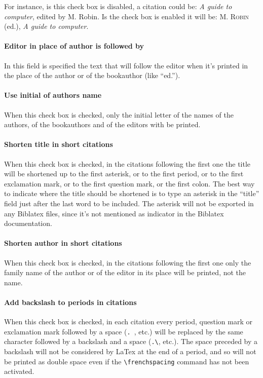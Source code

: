 \documentclass[a4paper,12pt]{report}
\begin{document}
\noindent For instance, is this check box is disabled, a citation could be: \textit{A guide to computer}, edited by M. Robin. Is the check box is enabled it will be: \textsc{M. Robin} (ed.), \textit{A guide to computer}.

\paragraph{Editor in place of author is followed by} In this field is specified the text that will follow the editor when it's printed in the place of the author or of the bookauthor (like “ed.”).

\paragraph{Use initial of authors name} When this check box is checked, only the initial letter of the names of the authors, of the bookauthors and of the editors with be printed.

\paragraph{Shorten title in short citations} When this check box is checked, in the citations following the first one the title will be shortened up to the first asterisk, or to the first period, or to the first exclamation mark, or to the first question mark, or the first colon. The best way to indicate where the title should be shortened is to type an asterisk in the “title” field just after the last word to be included. The asterisk will not be exported in any Biblatex files, since it's not mentioned as indicator in the Biblatex documentation.

\paragraph{Shorten author in short citations} When this check box is checked, in the citations following the first one only the family name of the author or of the editor in its place will be printed, not the name.

\paragraph{Add backslash to periods in citations} When this check box is checked, in each citation every period, question mark or exclamation mark followed by a space (\texttt{. }, etc.) will be replaced by the same character followed by a backslash and a space (\texttt{.\textbackslash \space }, etc.). The space preceded by a backslash will not be considered by LaTex at the end of a period, and so will not be printed as double space even if the \texttt{\textbackslash frenchspacing} command has not been activated.
\end{document}
